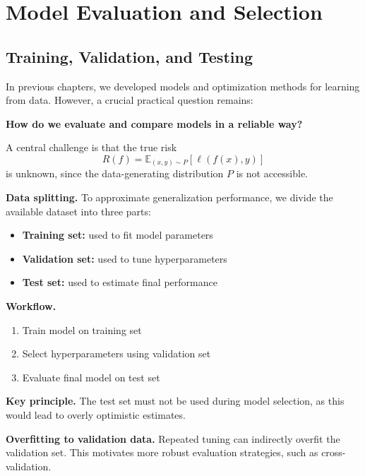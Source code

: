 \chapter{Model Evaluation and Selection}

\section{Training, Validation, and Testing}

In previous chapters, we developed models and optimization methods for learning from data. However, a crucial practical question remains:

\medskip

\noindent
\textbf{How do we evaluate and compare models in a reliable way?}

\medskip

A central challenge is that the true risk
\[
R(f) = \mathbb{E}_{(x,y)\sim P}[\ell(f(x), y)]
\]
is unknown, since the data-generating distribution $P$ is not accessible.

\medskip

\noindent
\textbf{Data splitting.}  
To approximate generalization performance, we divide the available dataset into three parts:

\begin{itemize}
    \item \textbf{Training set:} used to fit model parameters
    \item \textbf{Validation set:} used to tune hyperparameters
    \item \textbf{Test set:} used to estimate final performance
\end{itemize}

\medskip

\noindent
\textbf{Workflow.}
\begin{enumerate}
    \item Train model on training set
    \item Select hyperparameters using validation set
    \item Evaluate final model on test set
\end{enumerate}

\medskip

\noindent
\textbf{Key principle.}  
The test set must not be used during model selection, as this would lead to overly optimistic estimates.

\medskip

\noindent
\textbf{Overfitting to validation data.}  
Repeated tuning can indirectly overfit the validation set. This motivates more robust evaluation strategies, such as cross-validation.

